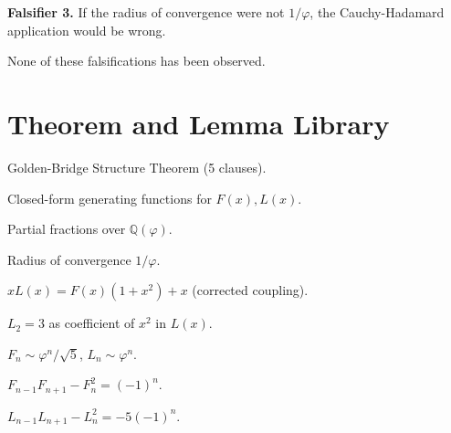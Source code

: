 \textbf{Falsifier 3.} If the radius of convergence were not $1/\varphi$,
the Cauchy-Hadamard application would be wrong.

None of these falsifications has been observed.

\section{Theorem and Lemma Library}
\label{fa_05:sec:05-library}

\begin{theorem}
Golden-Bridge Structure Theorem (5 clauses).
\end{theorem}

\begin{theorem}
Closed-form generating functions for $F(x), L(x)$.
\end{theorem}

\begin{theorem}
Partial fractions over $\mathbb{Q}(\varphi)$.
\end{theorem}

\begin{theorem}
Radius of convergence $1/\varphi$.
\end{theorem}

\begin{theorem}
$x L(x) = F(x)(1+x^2) + x$ (corrected coupling).
\end{theorem}

\begin{theorem}
$L_2 = 3$ as coefficient of $x^2$ in $L(x)$.
\end{theorem}

\begin{theorem}
$F_n \sim \varphi^n/\sqrt{5}$, $L_n \sim \varphi^n$.
\end{theorem}

\begin{theorem}
$F_{n-1} F_{n+1} - F_n^2 = (-1)^n$.
\end{theorem}

\begin{theorem}
$L_{n-1} L_{n+1} - L_n^2 = -5(-1)^n$.
\end{theorem}

